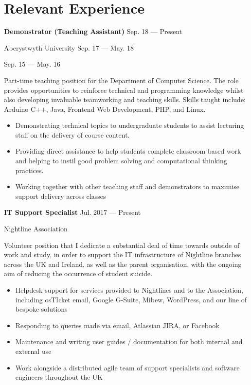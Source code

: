 \section{Relevant Experience}
\parbox[t][][t]{\linewidth}{
	\parbox{\linewidth}{{\textbf{Demonstrator (Teaching Assistant)}
		\hfill {{Sep. 18 --- Present}}}}
	\parbox{\linewidth}{{Aberystwyth University
		\hfill {{Sep. 17 --- May. 18}}}}
		\parbox{\linewidth}{{
			\hfill {{Sep. 15 --- May. 16}}}}
	\smallbreak
	
	\bigskip
	Part-time teaching position for the Department of Computer Science. The role provides opportunities to reinforce technical and programming knowledge
	whilst also developing invaluable teamworking and teaching skills. Skills taught include: Arduino C++, Java, Frontend Web Development, PHP, and Linux.
			
	\bigskip
	\begin{itemize}
		\item{Demonstrating technical topics to undergraduate students to assist lecturing staff on the delivery of course content.}\\[-.6em]
		\item{Providing direct assistance to help students complete classroom based work and helping to instil good problem solving and computational thinking practices.}\\[-.6em]
		\item{Working together with other teaching staff and demonstrators to maximise support delivery across classes}\\[-.6em]
	\end{itemize}
	\bigskip
	\bigskip
}

\parbox[t][][t]{\linewidth}{
	\parbox{\linewidth}{{\textbf{IT Support Specialist}}
	\hfill {{Jul. 2017 --- Present}}}
	\smallbreak

	\parbox{\linewidth}{Nightline Association}

	\bigskip
	Volunteer position that I dedicate a substantial deal of time towards outside of work and study, in order to support the IT infrastructure of Nightline branches across the UK and Ireland, as well as the parent organisation, with the ongoing aim of reducing the occurrence of student suicide.
		
	\bigskip
	\begin{itemize}
		\item{Helpdesk support for services provided to Nightlines and to the Association, including osTIcket email, Google G-Suite, Mibew, WordPress, and our line of bespoke solutions}\\[-.6em]
		\item{Responding to queries made via email, Atlassian JIRA, or Facebook}\\[-.6em]
		\item{Maintenance and writing user guides / documentation for both internal and external use}\\[-.6em]
		\item{Work alongside a distributed agile team of support specialists and software engineers throughout the UK}\\[-.6em]
	\bigskip
	\bigskip
	\end{itemize}
}

